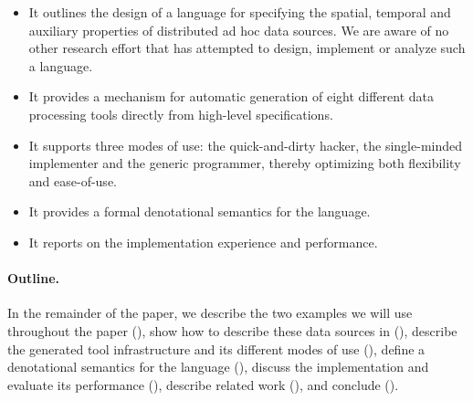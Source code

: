 \begin{itemize}
\item It outlines the design of a language for specifying the 
spatial, temporal and auxiliary properties of distributed ad hoc data
sources.  We are aware of no other research effort that has attempted
to design, implement or analyze such a language.

\item It provides a mechanism for automatic generation of eight different
data processing tools directly from high-level specifications.

\item It supports three modes of use:
the quick-and-dirty hacker, the single-minded implementer and the generic 
programmer, thereby optimizing both flexibility and ease-of-use.

\item It provides a formal denotational semantics for the language.

\item It reports on the implementation experience and performance.
\end{itemize}

\paragraph{Outline.}
In the remainder of the paper, we describe the two examples we will
use throughout the paper (), show how to describe
these data sources in \padsd{} (), describe
the generated tool infrastructure and its different modes of use
(), define a denotational semantics for the
language (), discuss the implementation and
evaluate its performance (), describe
related work (), and conclude
(). 

